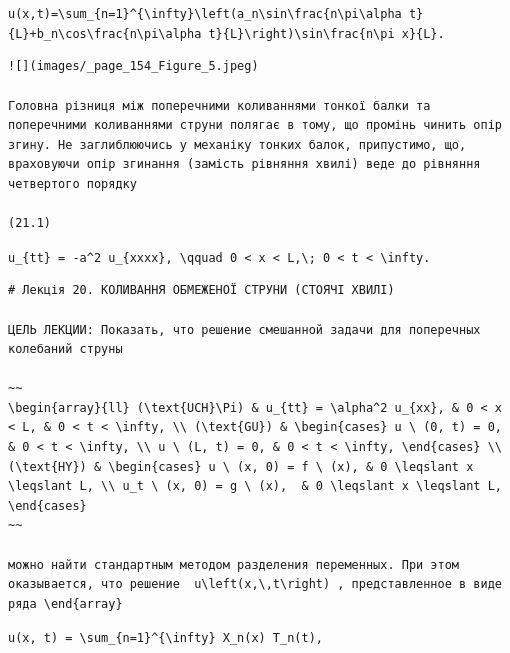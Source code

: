 \documentclass[
  ukrainian,
]{article}
\begin{document}
\texttt{u(x,t)=\textbackslash{}sum\_\{n=1\}\^{}\{\textbackslash{}infty\}\textbackslash{}left(a\_n\textbackslash{}sin\textbackslash{}frac\{n\textbackslash{}pi\textbackslash{}alpha\ t\}\{L\}+b\_n\textbackslash{}cos\textbackslash{}frac\{n\textbackslash{}pi\textbackslash{}alpha\ t\}\{L\}\textbackslash{}right)\textbackslash{}sin\textbackslash{}frac\{n\textbackslash{}pi\ x\}\{L\}.}

\begin{verbatim}
![](images/_page_154_Figure_5.jpeg)

Головна різниця між поперечними коливаннями тонкої балки та поперечними коливаннями струни полягає в тому, що промінь чинить опір згину. Не заглиблюючись у механіку тонких балок, припустимо, що, враховуючи опір згинання (замість рівняння хвилі) веде до рівняння четвертого порядку

(21.1)
\end{verbatim}

\texttt{u\_\{tt\}\ =\ -a\^{}2\ u\_\{xxxx\},\ \textbackslash{}qquad\ 0\ \textless{}\ x\ \textless{}\ L,\textbackslash{};\ 0\ \textless{}\ t\ \textless{}\ \textbackslash{}infty.}

\begin{verbatim}
# Лекція 20. КОЛИВАННЯ ОБМЕЖЕНОЇ СТРУНИ (СТОЯЧІ ХВИЛІ)

ЦЕЛЬ ЛЕКЦИИ: Показать, что решение смешанной задачи для поперечных колебаний струны

~~
\begin{array}{ll} (\text{UCH}\Pi) & u_{tt} = \alpha^2 u_{xx}, & 0 < x < L, & 0 < t < \infty, \\ (\text{GU}) & \begin{cases} u \ (0, t) = 0, & 0 < t < \infty, \\ u \ (L, t) = 0, & 0 < t < \infty, \end{cases} \\ (\text{HY}) & \begin{cases} u \ (x, 0) = f \ (x), & 0 \leqslant x \leqslant L, \\ u_t \ (x, 0) = g \ (x),  & 0 \leqslant x \leqslant L, \end{cases}
~~

можно найти стандартным методом разделения переменных. При этом оказывается, что решение  u\left(x,\,t\right) , представленное в виде ряда \end{array}
\end{verbatim}

\texttt{u(x,\ t)\ =\ \textbackslash{}sum\_\{n=1\}\^{}\{\textbackslash{}infty\}\ X\_n(x)\ T\_n(t),}
\end{document}

